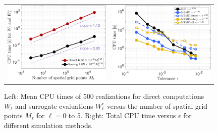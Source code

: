 %
\begin{figure}[ht!]\centering
\begin{tabular}{cc}
\includegraphics[height=0.36\linewidth]{./figures/CostPerSample_Ml.pdf}&
\includegraphics[height=0.36\linewidth]{./figures/Cost_epsilon.pdf}
\end{tabular}
\caption{Left: Mean CPU times of 500 realizations for direct computations $W_\ell$ and surrogate evaluations $W_\ell^e$ versus the number of spatial grid points $M_\ell$ for $\ell = 0$ to 5. Right: Total CPU time versus $\epsilon$ for different simulation methods.}
\label{fig:CostEstimatePlot}
\end{figure}
%




 







